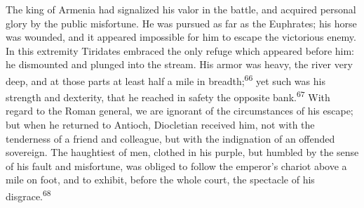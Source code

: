 The king of Armenia had signalized his valor in the battle, and
acquired personal glory by the public misfortune. He was pursued
as far as the Euphrates; his horse was wounded, and it appeared
impossible for him to escape the victorious enemy. In this
extremity Tiridates embraced the only refuge which appeared
before him: he dismounted and plunged into the stream. His armor
was heavy, the river very deep, and at those parts at least half
a mile in breadth;\textsuperscript{66} yet such was his strength and dexterity,
that he reached in safety the opposite bank.\textsuperscript{67} With regard to
the Roman general, we are ignorant of the circumstances of his
escape; but when he returned to Antioch, Diocletian received him,
not with the tenderness of a friend and colleague, but with the
indignation of an offended sovereign. The haughtiest of men,
clothed in his purple, but humbled by the sense of his fault and
misfortune, was obliged to follow the emperor’s chariot above a
mile on foot, and to exhibit, before the whole court, the
spectacle of his disgrace.\textsuperscript{68}







